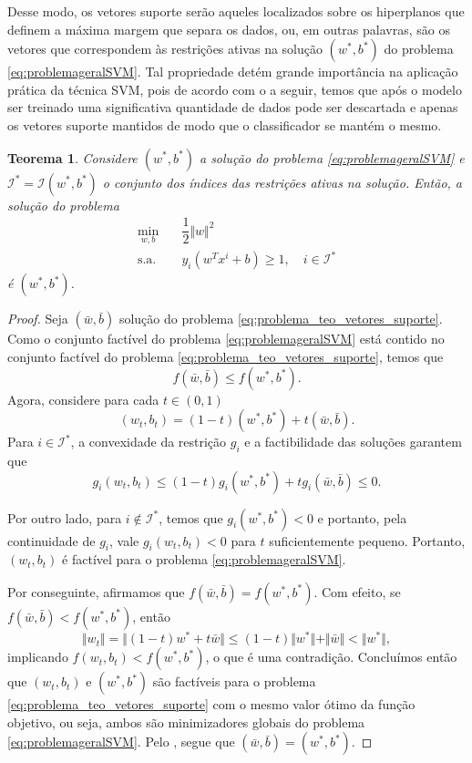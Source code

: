 \documentclass[12pt,a4paper]{scrartcl}
\newtheorem{teo}{Teorema}
\theoremstyle{definition}%
\begin{document}
Desse modo, os vetores suporte serão aqueles localizados sobre os hiperplanos que definem a máxima margem que separa os dados, ou, em outras palavras, são os vetores que correspondem às restrições ativas na solução $(w^{*}, b^{*})$ do problema \eqref{eq:problemageralSVM}. Tal propriedade detém grande importância na aplicação prática da técnica SVM, pois de acordo com o  a seguir, temos que após o modelo ser treinado uma significativa quantidade de dados pode ser descartada e apenas os vetores suporte mantidos de modo que o classificador se mantém o mesmo. 

\begin{teo} \label{teo:vetores_suporte}
Considere $(w^{*}, b^{*})$ a solução do problema \eqref{eq:problemageralSVM} e $\mathcal{I}^{*} = \mathcal{I} (w^{*}, b^{*})$ o conjunto dos índices das restrições ativas na solução. Então, a solução do problema
\[ \label{eq:problema_teo_vetores_suporte}
\begin{aligned}
\min_{w,b} & \quad \dfrac{1}{2} \Vert w\Vert^{2} \\
\text{s.a.} &  \quad y_i(w^{T}x^{i}+b) \geq 1, \quad i \in \mathcal{I}^{*}
\end{aligned}
\]
é $(w^{*}, b^{*})$.
\end{teo}
\begin{proof}
Seja $(\bar{w}, \bar{b} )$ solução do problema \eqref{eq:problema_teo_vetores_suporte}. Como o conjunto factível do problema \eqref{eq:problemageralSVM} está contido no conjunto factível do problema \eqref{eq:problema_teo_vetores_suporte}, temos que
\[
f(\bar{w}, \bar{b} ) \leq f(w^{*}, b^{*} ).
\]
Agora, considere para cada $t\in (0,1)$ 
\[
(w_{t}, b_{t}) = (1-t)(w^{*}, b^{*}) + t(\bar{w}, \bar{b}) .
\]
Para $i\in \mathcal{I}^{*}$, a convexidade da restrição $g_{i}$ e a factibilidade das soluções garantem que 
\[
g_{i} (w_{t}, b_{t}) \leq (1-t)g_{i} (w^{*}, b^{*}) + tg_{i} (\bar{w}, \bar{b}) \leq 0.
\]

Por outro lado, para $i\notin \mathcal{I}^{*}$, temos que $g_{i}(w^{*}, b^{*}) <0$ e portanto, pela continuidade de $g_{i}$, vale $g_{i} (w_{t}, b_{t}) <0$ para $t$ suficientemente pequeno. Portanto, $(w_{t}, b_{t})$ é factível para o problema \eqref{eq:problemageralSVM}.

Por conseguinte, afirmamos que $f(\bar{w}, \bar{b}) = f(w^{*}, b^{*})$. Com efeito, se $f(\bar{w}, \bar{b}) < f(w^{*}, b^{*})$, então
\[
\Vert w_{t} \Vert  = \Vert (1-t) w^{*} + t\bar{w} \Vert \leq (1-t) \Vert w^{*} \Vert + \Vert \bar{w} \Vert < \Vert w^{*} \Vert ,
\]
implicando $f(w_{t}, b_{t}) < f(w^{*}, b^{*})$, o que é uma contradição. 
Concluímos então que $(w_{t}, b_{t})$ e $(w^{*}, b^{*})$ são factíveis para o problema \eqref{eq:problema_teo_vetores_suporte} com o mesmo valor ótimo da função objetivo, ou seja, ambos são minimizadores globais do problema \eqref{eq:problemageralSVM}. Pelo , segue que $(\bar{w}, \bar{b}) = (w^{*}, b^{*})$.
\end{proof}
\end{document}
